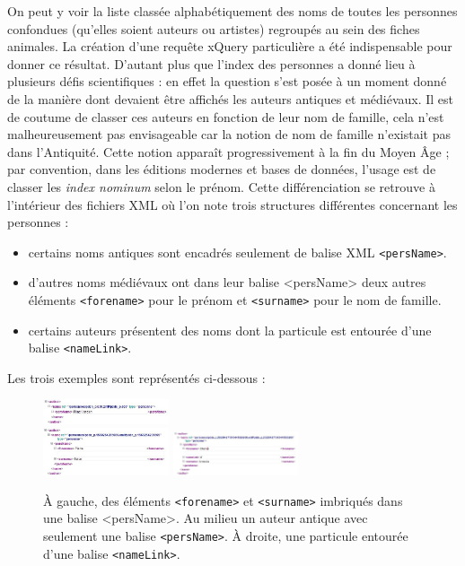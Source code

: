 \documentclass[a4paper,12pt,twoside]{book}
\begin{document}
On peut y voir la liste classée alphabétiquement des noms de toutes les personnes confondues (qu'elles soient auteurs ou artistes) regroupés au sein des fiches animales. La création d'une requête xQuery particulière a été indispensable pour donner ce résultat. D'autant plus que l'index des personnes a donné lieu
à plusieurs défis scientifiques : en effet la question s'est posée à un moment donné de la manière dont devaient être affichés les auteurs antiques et médiévaux. Il est de coutume de classer ces auteurs en fonction de leur nom de famille, cela n'est malheureusement pas envisageable car la notion de nom de famille n'existait pas dans l'Antiquité. Cette notion apparaît progressivement à la fin du Moyen Âge ; par convention, dans les éditions modernes et bases de données, l'usage est de classer les \textit{index nominum} selon le prénom. Cette différenciation se retrouve à l'intérieur des fichiers XML où l'on note trois structures différentes concernant les personnes :
\begin{itemize}
    \item certains noms antiques sont encadrés seulement de balise XML \texttt{<persName>}.
    \item d'autres noms médiévaux ont dans leur balise <persName> deux autres éléments \texttt{<forename>} pour le prénom et \texttt{<surname>} pour le nom de famille.
    \item certains auteurs présentent des noms dont la particule est entourée d'une balise \texttt{<nameLink>}.
\end{itemize}

Les trois exemples sont représentés ci-dessous :

\begin{figure}[H]
        \centering
       
        \includegraphics[width=0.33\textwidth]{img/partie_3/auteur_PA.JPG} \\
       
        \includegraphics[width=0.33\textwidth]{img/partie_3/auteur_PB.JPG}\hfill
        \includegraphics[width=0.33\textwidth]{img/partie_3/auteur_particule.JPG}
        \caption{À gauche, des éléments \texttt{<forename>} et \texttt{<surname>} imbriqués dans une balise <persName>. Au milieu un auteur antique avec seulement une balise \texttt{<persName>}. À droite, une particule entourée d'une balise \texttt{<nameLink>}.}
        \label{fig:foobar}
    \end{figure}
\end{document}
